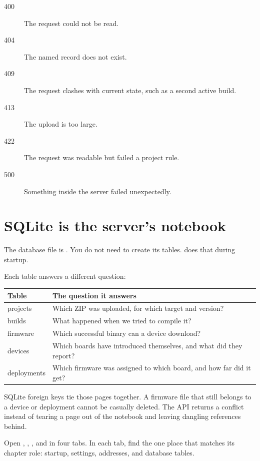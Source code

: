 \begin{description}
  \item[400] The request could not be read.
  \item[404] The named record does not exist.
  \item[409] The request clashes with current state, such as a second active build.
  \item[413] The upload is too large.
  \item[422] The request was readable but failed a project rule.
  \item[500] Something inside the server failed unexpectedly.
\end{description}

\section{SQLite is the server's notebook}

The database file is . You do not need to create its tables.  does that during startup.

Each table answers a different question:

\begin{longtable}{p{}p{}}
\toprule
Table & The question it answers\\
\midrule
\endhead
projects & Which ZIP was uploaded, for which target and version?\\
builds & What happened when we tried to compile it?\\
firmware & Which successful binary can a device download?\\
devices & Which boards have introduced themselves, and what did they report?\\
deployments & Which firmware was assigned to which board, and how far did it get?\\
\bottomrule
\end{longtable}

SQLite foreign keys tie those pages together. A firmware file that still belongs to a device or deployment cannot be casually deleted. The API returns a conflict instead of tearing a page out of the notebook and leaving dangling references behind.

\begin{checkpoint}
Open , , , and  in four tabs. In each tab, find the one place that matches its chapter role: startup, settings, addresses, and database tables.
\end{checkpoint}

